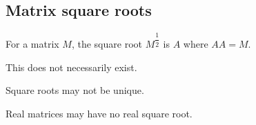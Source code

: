 
\subsection{Matrix square roots}

For a matrix \(M\), the square root \(M^{\dfrac{1}{2}}\) is \(A\) where \(AA=M\).

This does not necessarily exist.

Square roots may not be unique.

Real matrices may have no real square root.

